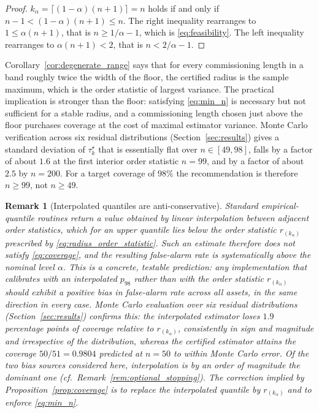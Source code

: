 \documentclass[a4paper]{cas-sc}
\newtheorem{remark}{Remark}
\newcommand{\residual}{\ensuremath{r}}
\begin{document}
\begin{proof}
\(k_\alpha=\lceil(1-\alpha)(n+1)\rceil=n\) holds if and only if
\(n-1<(1-\alpha)(n+1)\le n\). The right inequality rearranges to
\(1\le\alpha(n+1)\), that is \(n\ge 1/\alpha-1\), which is
\eqref{eq:feasibility}. The left inequality rearranges to
\(\alpha(n+1)<2\), that is \(n<2/\alpha-1\).
\end{proof}

Corollary~\ref{cor:degenerate_range} says that for every commissioning
length in a band roughly twice the width of the floor, the certified radius
is the sample maximum, which is the order statistic of largest variance.
The practical implication is stronger than the floor: satisfying
\eqref{eq:min_n} is necessary but not sufficient for a stable radius, and a
commissioning length chosen just above the floor purchases coverage at the
cost of maximal estimator variance. Monte Carlo verification across six
residual distributions (Section~\ref{sec:results}) gives a standard
deviation of \(\tau_k^\star\) that is essentially flat over
\(n\in[49,98]\), falls by a factor of about \(1.6\) at the first interior
order statistic \(n=99\), and by a factor of about \(2.5\) by \(n=200\). For
a target coverage of \(98\%\) the recommendation is therefore \(n\ge 99\),
not \(n\ge 49\).

\begin{remark}[Interpolated quantiles are anti-conservative]
\label{rem:interpolation_bias}
Standard empirical-quantile routines return a value obtained by linear
interpolation between adjacent order statistics, which for an upper
quantile lies \emph{below} the order statistic
\(\residual_{(k_\alpha)}\) prescribed by
\eqref{eq:radius_order_statistic}. Such an estimate therefore does not
satisfy \eqref{eq:coverage}, and the resulting false-alarm rate is
systematically above the nominal level \(\alpha\). This is a concrete,
testable prediction: any implementation that calibrates with an
interpolated \(p_{98}\) rather than with the order statistic
\(\residual_{(k_\alpha)}\) should exhibit a positive bias in false-alarm
rate across all assets, in the same direction in every case. Monte Carlo
evaluation over six residual distributions
(Section~\ref{sec:results}) confirms this: the interpolated estimator loses
\(1.9\) percentage points of coverage relative to
\(\residual_{(k_\alpha)}\), consistently in sign and magnitude and
irrespective of the distribution, whereas the certified estimator attains
the coverage \(50/51=0.9804\) predicted at \(n=50\) to within Monte Carlo
error. Of the two bias sources considered here, interpolation is by an
order of magnitude the dominant one
(cf.\ Remark~\ref{rem:optional_stopping}). The
correction implied by
Proposition~\ref{prop:coverage} is to replace the interpolated quantile by
\(\residual_{(k_\alpha)}\) and to enforce \eqref{eq:min_n}.
\end{remark}
\end{document}
